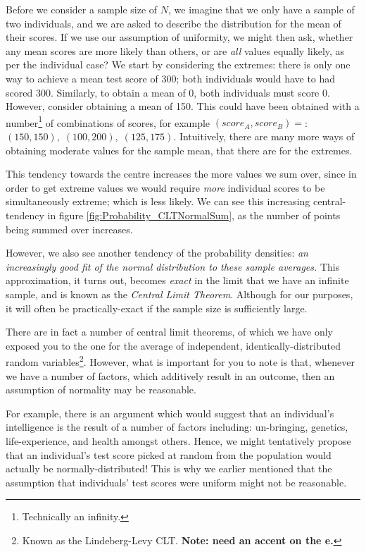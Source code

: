 \documentclass[11pt,fullpage]{book}
\begin{document}
Before we consider a sample size of $N$, we imagine that we only have a sample of two individuals, and we are asked to describe the distribution for the mean of their scores. If we use our assumption of uniformity, we might then ask, whether any mean scores are more likely than others, or are \textit{all} values equally likely, as per the individual case? We start by considering the extremes: there is only one way to achieve a mean test score of 300; both individuals would have to had scored 300. Similarly, to obtain a mean of 0, both individuals must score 0. However, consider obtaining a mean of 150. This could have been obtained with a number\footnote{Technically an infinity.} of combinations of scores, for example $\left(score_A,score_B\right)=$: $\left(150,150\right),\;\left(100,200\right),\;\left(125,175\right)$. Intuitively, there are many more ways of obtaining moderate values for the sample mean, that there are for the extremes. 

This tendency towards the centre increases the more values we sum over, since in order to get extreme values we would require \textit{more} individual scores to be simultaneously extreme; which is less likely. We can see this increasing central-tendency in figure \ref{fig:Probability_CLTNormalSum}, as the number of points being summed over increases.

However, we also see another tendency of the probability densities: \textit{an increasingly good fit of the normal distribution to these sample averages.} This approximation, it turns out, becomes \textit{exact} in the limit that we have an infinite sample, and is known as the \textit{Central Limit Theorem}. Although for our purposes, it will often be practically-exact if the sample size is sufficiently large. 

There are in fact a number of central limit theorems, of which we have only exposed you to the one for the average of independent, identically-distributed random variables\footnote{Known as the Lindeberg-Levy CLT. \textbf{Note: need an accent on the e.}}. However, what is important for you to note is that, whenever we have a number of factors, which additively result in an outcome, then an assumption of normality may be reasonable.

For example, there is an argument which would suggest that an individual's intelligence is the result of a number of factors including: un-bringing, genetics, life-experience, and health amongst others. Hence, we might tentatively propose that an individual's test score picked at random from the population would actually be normally-distributed! This is why we earlier mentioned that the assumption that individuals' test scores were uniform might not be reasonable.
\end{document}
